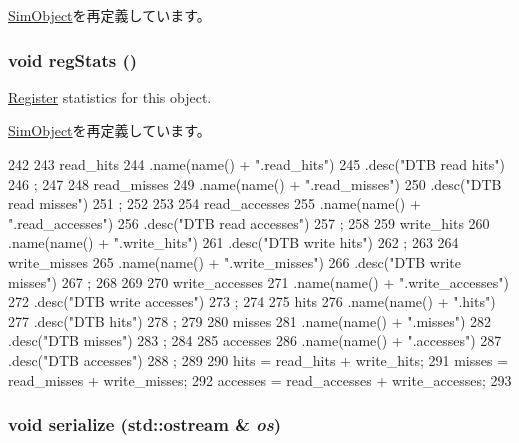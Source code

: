 \hyperlink{classSimObject_a4dc637449366fcdfc4e764cdf12d9b11}{SimObject}を再定義しています。\hypertarget{classMipsISA_1_1TLB_a4dc637449366fcdfc4e764cdf12d9b11}{
\subsubsection[{regStats}]{\setlength{\rightskip}{0pt plus 5cm}void regStats ()}}
\label{classMipsISA_1_1TLB_a4dc637449366fcdfc4e764cdf12d9b11}
\hyperlink{classRegister}{Register} statistics for this object. 

\hyperlink{classSimObject_a4dc637449366fcdfc4e764cdf12d9b11}{SimObject}を再定義しています。


\begin{DoxyCode}
242 {
243     read_hits
244         .name(name() + ".read_hits")
245         .desc("DTB read hits")
246         ;
247 
248     read_misses
249         .name(name() + ".read_misses")
250         .desc("DTB read misses")
251         ;
252 
253 
254     read_accesses
255         .name(name() + ".read_accesses")
256         .desc("DTB read accesses")
257         ;
258 
259     write_hits
260         .name(name() + ".write_hits")
261         .desc("DTB write hits")
262         ;
263 
264     write_misses
265         .name(name() + ".write_misses")
266         .desc("DTB write misses")
267         ;
268 
269 
270     write_accesses
271         .name(name() + ".write_accesses")
272         .desc("DTB write accesses")
273         ;
274 
275     hits
276         .name(name() + ".hits")
277         .desc("DTB hits")
278         ;
279 
280     misses
281         .name(name() + ".misses")
282         .desc("DTB misses")
283         ;
284 
285     accesses
286         .name(name() + ".accesses")
287         .desc("DTB accesses")
288         ;
289 
290     hits = read_hits + write_hits;
291     misses = read_misses + write_misses;
292     accesses = read_accesses + write_accesses;
293 }
\end{DoxyCode}
\hypertarget{classMipsISA_1_1TLB_a53e036786d17361be4c7320d39c99b84}{
\subsubsection[{serialize}]{\setlength{\rightskip}{0pt plus 5cm}void serialize (std::ostream \& {\em os})}}
\label{classMipsISA_1_1TLB_a53e036786d17361be4c7320d39c99b84}


